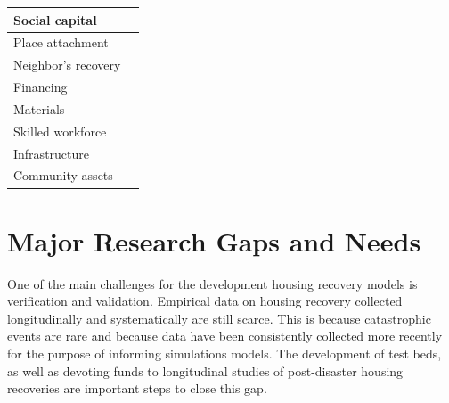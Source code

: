 \begin{table}[tbh]
\begin{tabularx}{\textwidth}{|l|X|}
    Social capital & \cite{airriess2008church,aldrich2010fixing,aldrich2011power,aldrich2012building,li2010katrina,burton2015validation,sadri2018role} \\ \midrule 
    
    Place attachment & \cite{chamlee2009there,cutter2010disaster,kick2011repetitive,binder2015rebuild,mcneil2015household,reid2015making} \\ \midrule
    
    Neighbor's recovery & \cite{dacy1969economics,rust2006financial,nejat2012agent} \\ \midrule 
    
    Financing & \cite{wu2004comparative,kamel2004residential,Nabil2004,comerio2014disaster,BankOfNZ2016,Nejat2016} \\ \midrule
    
    Materials & \cite{comerio2006estimating,REDi,bilau2015framework} \\ \midrule
    
    Skilled workforce & \cite{comerio2006estimating,chang2011identifying,boiser2011skills,bilau2015framework,hwang2015postdisaster,bothara2016challenges,REDi} \\ \midrule 
    
    Infrastructure & \cite{Miles2011,comerio2014disaster,burton2015validation,nejat2019anchors} \\ \midrule
    
    Community assets & \cite{Miles2011,comerio2014disaster,burton2015validation,nejat2019anchors} \\

    \bottomrule

    \end{tabularx}
    \label{tab:FactorsHousingRecovery}
\end{table}

\FloatBarrier
\section{Major Research Gaps and Needs}

One of the main challenges for the development housing recovery models is verification and validation. Empirical data on housing recovery collected longitudinally and systematically are still scarce. This is because catastrophic events are rare and because data have been consistently collected more recently  for the purpose of informing simulations models. The development of test beds, as well as devoting funds to longitudinal studies of post-disaster housing recoveries are important steps to close this gap.\ 

